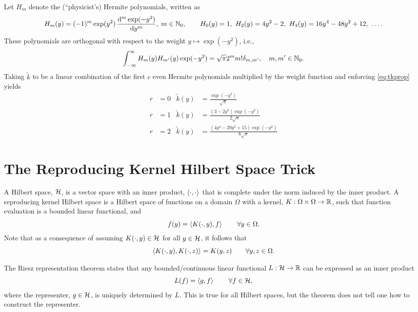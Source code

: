 \documentclass[letterpaper]{amsart}
\newcommand{\tk}{\tilde{k}}
\begin{document}
Let $H_m$ denote the (``physicist's) Hermite polynomials, written as
\begin{equation*}
	H_m(y) = (-1)^m \exp(y^2) \, \frac{\dif^m \exp(-y^2)}{\dif y^m}, \; m \in \natzero, \qquad
	H_0(y) = 1, \ H_2(y) = 4y^2-2, \ H_4(y) = 16 y^4 - 48 y^2 + 12, \ \ldots.
\end{equation*}
These polynomials are orthogonal with respect to the weight $y \mapsto \exp(-y^2)$, i.e.,
\begin{equation*}
	\int_{-\infty}^{\infty} H_m(y) H_{m'}(y) \exp(-y^2) = \sqrt{\pi} 2^m m! \delta_{m,m'}, \quad m,m' \in \mathbb{N}_{0}.
\end{equation*}
Taking $\tk$ to be a linear combination of the first $r$ even Hermite polynomials multiplied by the weight function and enforcing \eqref{eq:tkprop} yields
\begin{align*}
	r& = 0  & \tk(y) &= \frac{\exp(-y^2)}{\sqrt{\pi}}
		\\
	r& = 1 &  \tk(y) & =\frac{\left(3 - 2y^{2}\right) \exp(- y^{2})}{2\sqrt{\pi}} \\
	r &= 2 & \tk(y) & = \frac{\left(4 y^{4} - 20 y^{2} + 15\right) \exp(- y^{2})}{8 \sqrt{\pi}}
\end{align*}




\appendix

\section{The Reproducing Kernel Hilbert Space Trick} \label{app:rkhs}
A Hilbert space, $\mathcal{H}$, is a vector space with an inner product, $\left \langle \cdot, \cdot \right \rangle_{{}}$ that is complete under the norm induced by the inner product.  A reproducing kernel Hilbert space \cite{RKHSwiki} is a Hilbert space of functions on a domain $\Omega$ with a kernel, $K:\Omega \times \Omega \to \mathbb{R}$, such that function evaluation is a bounded linear functional, and
\begin{equation} \label{eq:repproperty}
    f(y) = \left \langle K(\cdot,y), f \right \rangle_{{}} \qquad \forall y \in \Omega.
\end{equation}
Note that as a consequence of assuming $K(\cdot,y) \in \mathcal{H}$ for all $y\in \mathcal{H}$, it follows that
\begin{equation} \label{eq:rkip}
    \left \langle K(\cdot,y), K(\cdot, z) \right \rangle_{{}} = K(y,z) \qquad \forall y,z \in \Omega.
\end{equation}

The Riesz representation theorem \cite{RieszWiki} states that any bounded/continuous linear functional $L:\mathcal{H} \to \mathbb{R}$ can be expressed as an inner product
\begin{equation}\label{eq:RTT}
L(f) = \left \langle g, f \right \rangle_{{}} \qquad \forall f \in \mathcal{H},
\end{equation}
where the representer, $g \in \mathcal{H}$, is uniquely determined by $L$.  This is true for all Hilbert spaces, but the theorem does not tell one how to construct the representer.
\end{document}
